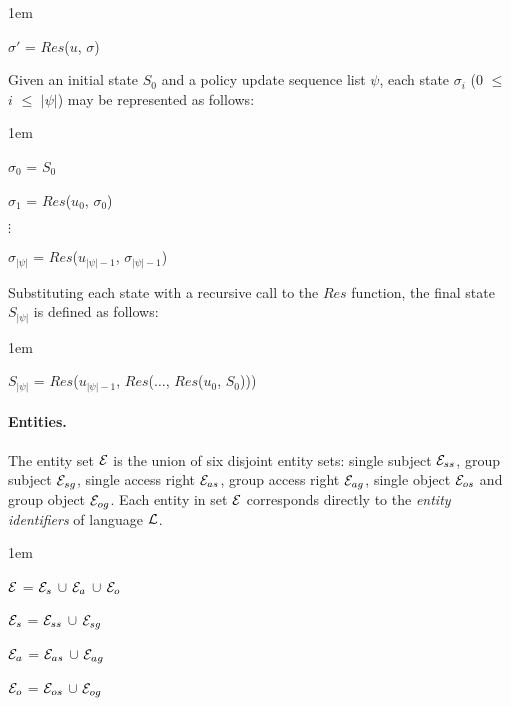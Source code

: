 \documentclass[global,twocolumn,final]{svjour}
\newenvironment{vquote}
  {\begin{list}{}{\leftmargin 1em}\item[]}
  {\end{list}}
\begin{document}
        \begin{vquote}
          $\sigma'$ = $Res$($u$, $\sigma$)
        \end{vquote}

        Given an initial state $S_{0}$ and a policy update sequence list
        $\psi$, each state $\sigma_{i}$ ($0$ $\leq$ $i$ $\leq$ $|\psi|$)
        may be represented as follows:

        \begin{vquote}
          $\sigma_{0}$ = $S_{0}$

          $\sigma_{1}$ = $Res$($u_{0}$, $\sigma_{0}$)

          $\vdots$

          $\sigma_{|\psi|}$ = $Res$($u_{|\psi| - 1}$, $\sigma_{|\psi| - 1}$)
        \end{vquote}

        Substituting each state with a recursive call to the $Res$ function,
        the final state $S_{|\psi|}$ is defined as follows:

        \begin{vquote}
          $S_{|\psi|}$ = $Res$($u_{|\psi| - 1}$, $Res$($\ldots$, $Res$($u_{0}$, $S_{0}$)))
        \end{vquote}

        \paragraph{Entities.}

          The entity set ${\cal E}$ is the union of six disjoint entity sets:
          single subject ${\cal E}_{ss}$, group subject ${\cal E}_{sg}$,
          single access right ${\cal E}_{as}$, group access right
          ${\cal E}_{ag}$, single object ${\cal E}_{os}$ and group object
          ${\cal E}_{og}$. Each entity in set ${\cal E}$ corresponds directly
          to the {\em entity identifiers} of language ${\cal L}$.

          \begin{vquote}
            ${\cal E}$ =
            ${\cal E}_{s}$ $\cup$ ${\cal E}_{a}$ $\cup$ ${\cal E}_{o}$

            ${\cal E}_{s}$ = ${\cal E}_{ss}$ $\cup$ ${\cal E}_{sg}$

            ${\cal E}_{a}$ = ${\cal E}_{as}$ $\cup$ ${\cal E}_{ag}$

            ${\cal E}_{o}$ = ${\cal E}_{os}$ $\cup$ ${\cal E}_{og}$
          \end{vquote}
\end{document}
